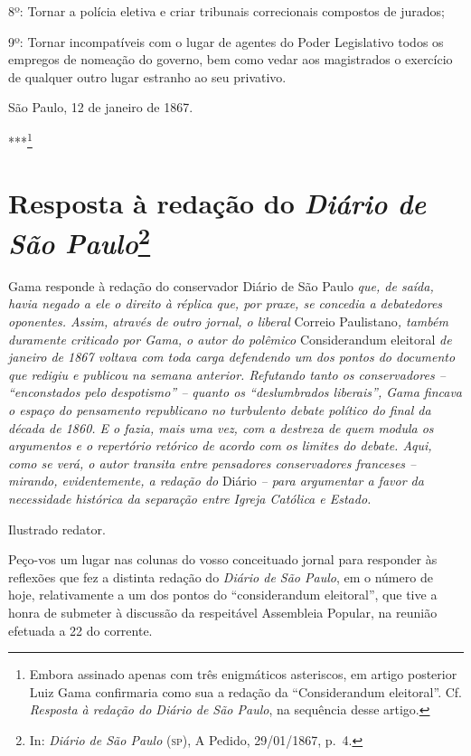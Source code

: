 8º: Tornar a polícia eletiva e criar tribunais correcionais compostos de
jurados;

9º: Tornar incompatíveis com o lugar de agentes do Poder Legislativo
todos os empregos de nomeação do governo, bem como vedar aos magistrados
o exercício de qualquer outro lugar estranho ao seu privativo.
\begin{flushright}
São Paulo, 12 de janeiro de 1867.
\end{flushright}
***\footnote{Embora assinado apenas com três enigmáticos asteriscos,
  em artigo posterior Luiz Gama confirmaria como sua a redação da
  ``Considerandum eleitoral''. Cf. \emph{Resposta à redação do Diário de
  São Paulo}, na sequência desse artigo.}

\chapter{Resposta à redação do \emph{Diário de São Paulo}\footnote{In:
  \emph{Diário de São Paulo} (\textsc{sp}), A Pedido, 29/01/1867, p.~4.}}

\begin{didascalia}
Gama responde à redação do conservador Diário de São Paulo \emph{que, de
saída, havia negado a ele o direito à réplica que, por praxe, se
concedia a debatedores oponentes. Assim, através de outro jornal, o
liberal} Correio Paulistano\emph{, também duramente criticado por Gama,
o autor do polêmico} Considerandum eleitoral \emph{de janeiro de 1867
voltava com toda carga defendendo um dos pontos do documento que redigiu
e publicou na semana anterior. Refutando tanto os conservadores --
``enconstados pelo despotismo'' -- quanto os ``deslumbrados liberais'', Gama
fincava o espaço do pensamento republicano no turbulento debate político
do final da década de 1860. E o fazia, mais uma vez, com a destreza de
quem modula os argumentos e o repertório retórico de acordo com os
limites do debate. Aqui, como se verá, o autor transita entre pensadores
conservadores franceses -- mirando, evidentemente, a redação do} Diário
\emph{-- para argumentar a favor da necessidade histórica da separação
entre Igreja Católica e Estado.}
\end{didascalia}



Ilustrado redator.

Peço-vos um lugar nas colunas do vosso conceituado jornal para responder
às reflexões que fez a distinta redação do \emph{Diário de São Paulo}, em
o número de hoje, relativamente a um dos pontos do ``considerandum
eleitoral'', que tive a honra de submeter à discussão da respeitável
Assembleia Popular, na reunião efetuada a 22 do corrente.

